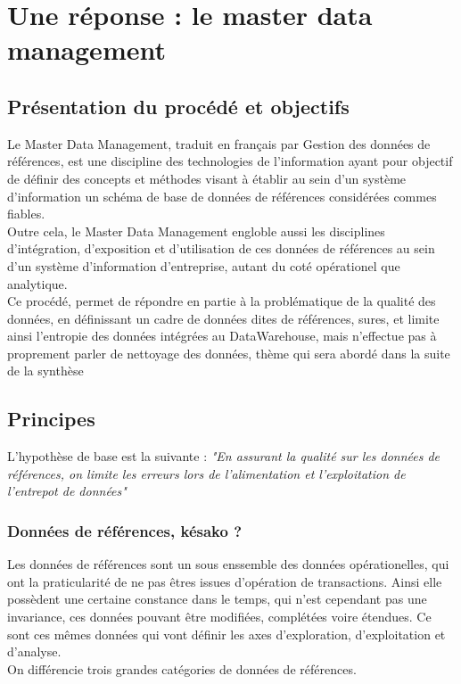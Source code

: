 \section{Une réponse : le master data management}

\subsection{Présentation du procédé et objectifs} 

Le Master Data Management, traduit en français par Gestion des données de références, est une discipline des technologies de l'information ayant pour objectif de définir des concepts et méthodes visant à établir au sein d'un système d'information un schéma de base de données de références considérées commes fiables.\\
Outre cela, le Master Data Management engloble aussi les disciplines d'intégration, d'exposition et d'utilisation de ces données de références au sein d'un système d'information d'entreprise, autant du coté opérationel que analytique.\\
Ce procédé, permet de répondre en partie à la problématique de la qualité des données, en définissant un cadre de données dites de références, sures, et limite ainsi l'entropie des données intégrées au DataWarehouse, mais n'effectue pas à proprement parler de nettoyage des données, thème qui sera abordé dans la suite de la synthèse\\

\subsection{Principes}

L'hypothèse de base est la suivante : \textit{"En assurant la qualité sur les données de références, on limite les erreurs lors de l'alimentation et l'exploitation de l'entrepot de données"}\\

\subsubsection{Données de références, késako ? }

Les données de références sont un sous enssemble des données opérationelles, qui ont la praticularité de ne pas êtres issues d'opération de transactions. Ainsi elle possèdent une certaine constance dans le temps, qui n'est cependant pas une invariance, ces données pouvant être modifiées, complétées voire étendues. Ce sont ces mêmes données qui vont définir les axes d'exploration, d'exploitation et d'analyse.\\
On différencie trois grandes catégories de données de références.

